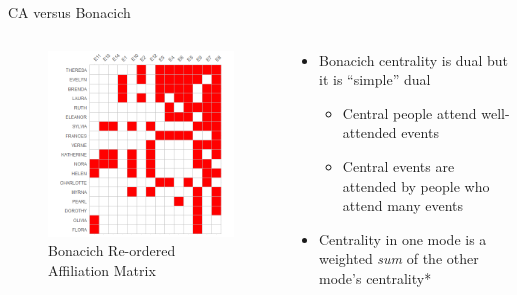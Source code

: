 \documentclass[
  ignorenonframetext,
]{beamer}
\providecommand{\tightlist}{%
  \setlength{\itemsep}{0pt}\setlength{\parskip}{0pt}}\usepackage{longtable,booktabs,array}
\begin{document}
\begin{frame}{CA versus Bonacich}
\protect\hypertarget{ca-versus-bonacich-14}{}
\begin{columns}[T]
\begin{column}{0.5\textwidth}
\begin{figure}

{\centering \includegraphics{Plots/bon-reord.png}

}

\caption{Bonacich Re-ordered Affiliation Matrix}

\end{figure}
\end{column}

\begin{column}{0.5\textwidth}
\begin{itemize}
\tightlist
\item
  Bonacich centrality is dual but it is ``simple'' dual

  \begin{itemize}
  \tightlist
  \item
    Central people attend well-attended events
  \item
    Central events are attended by people who attend many events
  \end{itemize}
\item
  Centrality in one mode is a weighted \emph{sum} of the other mode's
  centrality*
\end{itemize}


\end{column}
\end{columns}
\end{frame}
\end{document}
